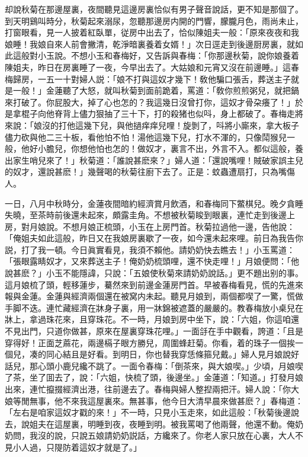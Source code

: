 却說秋菊在那邊屋裏，夜間聽見這邊房裏恰似有男子聲音說話，更不知是那個了。到天明鷄叫時分，秋菊起來溺尿，忽聽那邊房内開的門響，朦朧月色，雨尚未止，打窗眼看，見一人披着紅臥單，従房中出去了，恰似陳姐夫一般：「原來夜夜和我娘睡！我娘自來人前會撇清，乾淨暗裏養着女婿！」次日逕走到後邊厨房裏，就如此這般對小玉說。不想小玉和春梅好，又告訴與春梅：「你那邊秋菊，說你娘養着陳姐夫，昨日在房裏睡了一夜，今早出去了。大姑娘和元宵又沒在前邊睡。」這春梅歸房，一五一十對婦人説：「娘不打與這奴才幾下！敎他騙口張舌，葬送主子就是一般！」金蓮聽了大怒，就叫秋菊到面前跪着，罵道：「敎你煎煎粥兒，就把鍋來打破了。你屁股大，掉了心也怎的？我這幾日沒曾打你，這奴才骨朶癢了！」於是拿棍子向他脊背上儘力狠抽了三十下，打的殺猪也似呌，身上都破了。春梅走將來說：「娘沒的打他這幾下兒，與他撾痒痒兒哩！旋剝了，呌將小廝來，拿大板子儘力砍與他二三十板，看他怕不怕！湯他這幾下兒，打水不渾的，只像鬦猴兒一般，他好小膽兒，你想他怕也怎的！做奴才，裏言不出，外言不入。都似這般，養出家生哨兒來了！」秋菊道：「誰說甚麽來？」婦人道：「還說嘴哩！賊破家誤主兒的奴才，還說甚麽！」幾聲喝的秋菊往廚下去了。正是：蚊蟲遭扇打，只為嘴傷人。

一日，八月中秋時分，金蓮夜間暗約經濟賞月飲酒，和春梅同下鱉棋兒。晚夕貪睡失曉，至茶時前後還未起來，頗露圭角。不想被秋菊睃到眼裏，連忙走到後邊上房，對月娘說。不想月娘正梳頭，小玉在上房門首。秋菊拉過他一邊，告他說：「俺姐夫如此這般，昨日又在我娘房裏歇了一夜，如今還未起來哩。前日為我告你説，打了我一頓。今日眞實看見，我須不賴他。請奶奶快去瞧去！」小玉罵道：「張眼露睛奴才，又來葬送主子！俺奶奶梳頭哩，還不快走哩！」月娘便問：「他說甚麽？」小玉不能隱諱，只說：「五娘使秋菊來請奶奶說話。」更不題出别的事。這月娘梳了頭，輕移蓮步，驀然來到前邊金蓮房門首。早被春梅看見，慌的先進來報與金蓮。金蓮與經濟兩個還在被窝内未起。聽見月娘到，兩個都喫了一驚，慌做手脚不迭。連忙藏經濟在牀身子裏，用一牀錦被遮蓋的嚴嚴的。教春梅放小桌兒在牀上，拿過珠花來，且穿珠花。不一時，月娘到房中坐下，說：「六姐，你這咱還不見出門，只道你做甚，原來在屋裏穿珠花哩。」一面㧱在手中觀看，誇道：「且是穿得好！正面芝蔴花，兩邊槅子眼方勝兒，周圍蜂赶菊。你看，着的珠子一個挨一個兒，凑的同心結且是好看。到明日，你也替我穿恁條箍兒戴。」婦人見月娘說好話兒，那心頭小鹿兒纔不跳了。一面令春梅：「倒茶來，與大娘喫。」少頃，月娘喫了茶，坐了囬去了，說：「六姐，快梳了頭，後邊坐。」金蓮道：「知道。」打發月娘出來，連忙攛掇經濟出港，往前邊去了。春梅與婦人整揑兩把汗。婦人說：「你大娘等閒無事，他不來我這屋裏來。無甚事，他今日大清早晨來做甚麽？」春梅道：「左右是咱家這奴才戳的來！」不一時，只見小玉走來，如此這般：「秋菊後邊說去，說姐夫在這屋裏，明睡到夜，夜睡到明。被我罵喝了他兩聲，他還不動。俺奶奶問，我沒的說，只說五娘請奶奶説話，方纔來了。你老人家只放在心裏，大人不見小人過，只隄防着這奴才就是了。」

